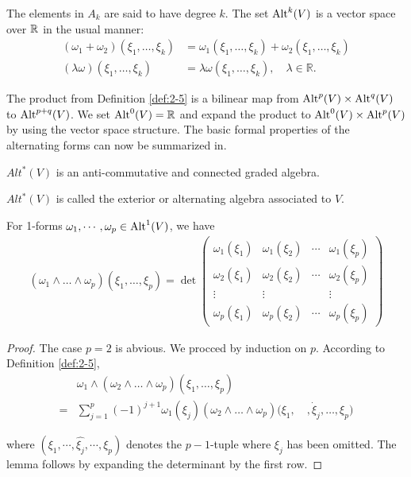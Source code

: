 The elements in $A_k$ are said to have degree $k$. The set $\operatorname{Alt}^k(V)$ is a vector space
over $\mathbb{R}$ in the usual manner:
\begin{align*}
  (\omega_1+\omega_2)(\xi_1,\dots,\xi_k) & = \omega_1(\xi_1,\dots,\xi_k)+\omega_2(\xi_1,\dots,\xi_k)\\
  (\lambda\omega)(\xi_1,\dots,\xi_k)     & = \lambda\omega(\xi_1,\dots,\xi_k),\quad\lambda\in\mathbb{R}. 
\end{align*}


The product from Definition \ref{def:2-5} is a bilinear map from $\operatorname{Alt}^p(V)\times\operatorname{Alt}^q(V)$ to 
$\operatorname{Alt}^{p+q}(V)$. We set $\operatorname{Alt}^0(V)=\mathbb{R}$ and expand the product to $\operatorname{Alt}^0(V)\times\operatorname{Alt}^p(V)$ by
using the vector space structure. The basic formal properties of the alternating forms can now be 
summarized in. 


\begin{theorem}\label{theorem:2-12}
  $Alt^*(V)$ is an anti-commutative and connected graded algebra.
\end{theorem}

$Alt^*(V)$ is called the exterior or alternating algebra associated to $V$.


\begin{lemma}\label{lemma:2-13}
  For 1-forms $\omega_1, \cdots, \omega_p\in\operatorname{Alt}^1(V)$, we have 
  \begin{align*}
    (\omega_1\wedge\dots\wedge\omega_p)(\xi_1,\dots,\xi_p)
    = \det
    \begin{pmatrix}
      \omega_1(\xi_1) & \omega_1(\xi_2) & \cdots & \omega_1(\xi_p)\\
      \omega_2(\xi_1) & \omega_2(\xi_2) & \cdots & \omega_2(\xi_p)\\
      \vdots          & \vdots          &        & \vdots\\
      \omega_p(\xi_1) & \omega_p(\xi_2) & \cdots & \omega_p(\xi_p)
    \end{pmatrix}
  \end{align*}
\end{lemma}

\begin{proof}
  The case $p=2$ is abvious. We procced by induction on $p$. According to Definition \ref{def:2-5},
  \begin{align*}
      & \omega_{1}\wedge(\omega_{2}\wedge\ldots\wedge\omega_{p})(\xi_{1},\ldots,\xi_{p})\\
    = & \sum_{j=1}^{p}(-1)^{j+1}\omega_{1}(\xi_{j})(\omega_{2}\wedge\ldots\wedge\omega_{p})
      \Big(\xi_{1},\quad,\dot{\xi}_{j},\ldots,\xi_{p}\Big)
  \end{align*}

  where $(\xi_1, \cdots, \hat{\xi_j}, \cdots, \xi_p)$ denotes the $p-1$-tuple where 
  $\xi_j$ has been omitted. The lemma follows by expanding the determinant by the first row.
\end{proof}


